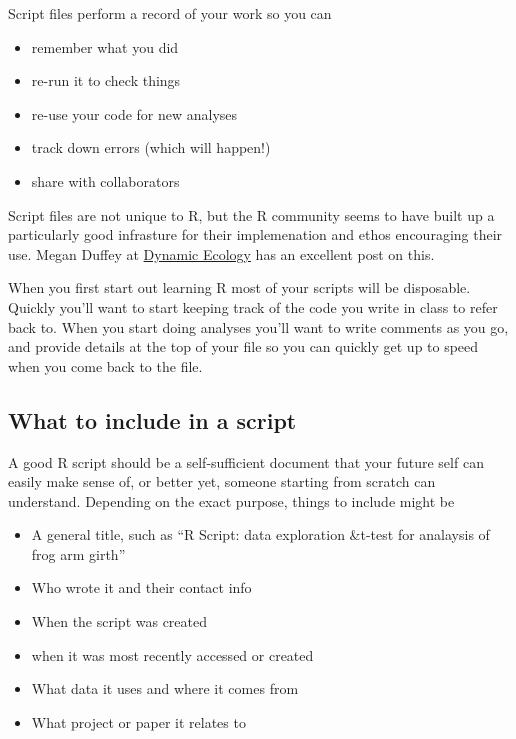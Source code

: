 \documentclass[]{book}
\providecommand{\tightlist}{%
  \setlength{\itemsep}{0pt}\setlength{\parskip}{0pt}}
\theoremstyle{definition}
\theoremstyle{definition}
\theoremstyle{definition}
\theoremstyle{remark}
\begin{document}
Script files perform a record of your work so you can

\begin{itemize}
\tightlist
\item
  remember what you did
\item
  re-run it to check things
\item
  re-use your code for new analyses
\item
  track down errors (which will happen!)
\item
  share with collaborators
\end{itemize}

Script files are not unique to R, but the R community seems to have
built up a particularly good infrasture for their implemenation and
ethos encouraging their use. Megan Duffey at
\href{https://dynamicecology.wordpress.com/2015/02/18/the-biggest-benefit-of-my-shift-to-r-reproducibility/}{Dynamic
Ecology} has an excellent post on this.

When you first start out learning R most of your scripts will be
disposable. Quickly you'll want to start keeping track of the code you
write in class to refer back to. When you start doing analyses you'll
want to write comments as you go, and provide details at the top of your
file so you can quickly get up to speed when you come back to the file.

\subsection{What to include in a
script}\label{what-to-include-in-a-script}

A good R script should be a self-sufficient document that your future
self can easily make sense of, or better yet, someone starting from
scratch can understand. Depending on the exact purpose, things to
include might be

\begin{itemize}
\tightlist
\item
  A general title, such as ``R Script: data exploration \&t-test for
  analaysis of frog arm girth''
\item
  Who wrote it and their contact info
\item
  When the script was created
\item
  when it was most recently accessed or created
\item
  What data it uses and where it comes from
\item
  What project or paper it relates to
\end{itemize}
\end{document}
